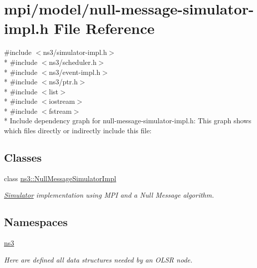 \hypertarget{null-message-simulator-impl_8h}{}\section{mpi/model/null-\/message-\/simulator-\/impl.h File Reference}
\label{null-message-simulator-impl_8h}
{\ttfamily \#include $<$ns3/simulator-\/impl.\+h$>$}\\*
{\ttfamily \#include $<$ns3/scheduler.\+h$>$}\\*
{\ttfamily \#include $<$ns3/event-\/impl.\+h$>$}\\*
{\ttfamily \#include $<$ns3/ptr.\+h$>$}\\*
{\ttfamily \#include $<$list$>$}\\*
{\ttfamily \#include $<$iostream$>$}\\*
{\ttfamily \#include $<$fstream$>$}\\*
Include dependency graph for null-\/message-\/simulator-\/impl.h\+:
This graph shows which files directly or indirectly include this file\+:
\subsection*{Classes}
\begin{DoxyCompactItemize}
\item 
class \hyperlink{classns3_1_1NullMessageSimulatorImpl}{ns3\+::\+Null\+Message\+Simulator\+Impl}
\begin{DoxyCompactList}\small\item\em \hyperlink{classns3_1_1Simulator}{Simulator} implementation using M\+PI and a Null Message algorithm. \end{DoxyCompactList}\end{DoxyCompactItemize}
\subsection*{Namespaces}
\begin{DoxyCompactItemize}
\item 
 \hyperlink{namespacens3}{ns3}
\begin{DoxyCompactList}\small\item\em Here are defined all data structures needed by an O\+L\+SR node. \end{DoxyCompactList}\end{DoxyCompactItemize}
